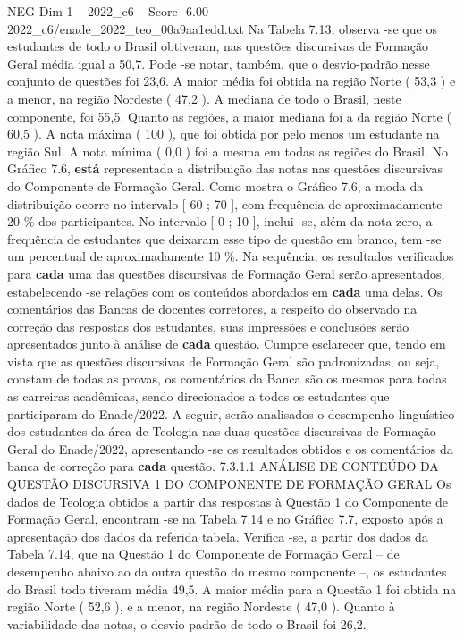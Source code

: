 \begin{textsample}{NEG Dim 1 – 2022\_c6 – Score -6.00 – 2022\_c6/enade\_2022\_teo\_00a9aa1edd.txt}
Na Tabela 7.13, observa -se que os estudantes de todo o Brasil obtiveram, nas questões discursivas de Formação Geral média igual a 50,7.
Pode -se notar, também, que o desvio-padrão nesse conjunto de questões foi 23,6.
A maior média foi obtida na região Norte ( 53,3 ) e a menor, na região Nordeste ( 47,2 ).
A mediana de todo o Brasil, neste componente, foi 55,5.
Quanto as regiões, a maior mediana foi a da região Norte ( 60,5 ).
A nota máxima ( 100 ), que foi obtida por pelo menos um estudante na região Sul.
A nota mínima ( 0,0 ) foi a mesma em todas as regiões do Brasil.
No Gráfico 7.6, \textbf{está} representada a distribuição das notas nas questões discursivas do Componente de Formação Geral.
Como mostra o Gráfico 7.6, a moda da distribuição ocorre no intervalo [ 60 ; 70 ], com frequência de aproximadamente 20 \% dos participantes.
No intervalo [ 0 ; 10 ], inclui -se, além da nota zero, a frequência de estudantes que deixaram esse tipo de questão em branco, tem -se um percentual de aproximadamente 10 \%.
Na sequência, os resultados verificados para \textbf{cada} uma das questões discursivas de Formação Geral serão apresentados, estabelecendo -se relações com os conteúdos abordados em \textbf{cada} uma delas.
Os comentários das Bancas de docentes corretores, a respeito do observado na correção das respostas dos estudantes, suas impressões e conclusões serão apresentados junto à análise de \textbf{cada} questão.
Cumpre esclarecer que, tendo em vista que as questões discursivas de Formação Geral são padronizadas, ou seja, constam de todas as provas, os comentários da Banca são os mesmos para todas as carreiras acadêmicas, sendo direcionados a todos os estudantes que participaram do Enade/2022.
A seguir, serão analisados o desempenho linguístico dos estudantes da área de Teologia nas duas questões discursivas de Formação Geral do Enade/2022, apresentando -se os resultados obtidos e os comentários da banca de correção para \textbf{cada} questão. 7.3.1.1 ANÁLISE DE CONTEÚDO DA QUESTÃO DISCURSIVA 1 DO COMPONENTE DE FORMAÇÃO GERAL Os dados de Teologia obtidos a partir das respostas à Questão 1 do Componente de Formação Geral, encontram -se na Tabela 7.14 e no Gráfico 7.7, exposto após a apresentação dos dados da referida tabela.
Verifica -se, a partir dos dados da Tabela 7.14, que na Questão 1 do Componente de Formação Geral – de desempenho abaixo ao da outra questão do mesmo componente –, os estudantes do Brasil todo tiveram média 49,5.
A maior média para a Questão 1 foi obtida na região Norte ( 52,6 ), e a menor, na região Nordeste ( 47,0 ).
Quanto à variabilidade das notas, o desvio-padrão de todo o Brasil foi 26,2.

\end{textsample}
